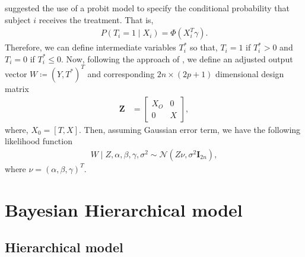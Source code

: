 \documentclass{amsart}
\newcommand{\normal}{\mathcal{N}}
\begin{document}
\citet{koch2020} suggested the use of a probit model to specify the conditional probability that
subject $i$ receives the treatment. That is,
\begin{align}
    P(T_i=1\mid X_i) = \Phi(X_i^T\gamma).
\end{align}
Therefore, we can define intermediate variables $T_i^*$ so that, $T_i=1$ if $T_i^*>0$ and
$T_i=0$ if $T_i^*\le0$. Now, following the approach of \citet{koch2018}, we define an adjusted
output vector $W\coloneqq(Y, T^*)^T$ and corresponding $2n\times(2p+1)$ dimensional design matrix
\begin{align}
    \boldsymbol{Z} &=
    \begin{bmatrix}
     X_O & 0 \\
     0 & X
    \end{bmatrix},
\end{align}
where, $X_0 = [T, X]$. Then, assuming Gaussian error term, we have the following likelihood function
\begin{align}
W\mid Z, \alpha, \beta, \gamma, \sigma^2 \sim\normal\left(Z\nu, \sigma^2\mathbf{I}_{2n}\right),
\end{align}
where $\nu = (\alpha, \beta, \gamma)^T$.

\section{Bayesian Hierarchical model}\label{sec:bayes}
\subsection{Hierarchical model}
\end{document}
